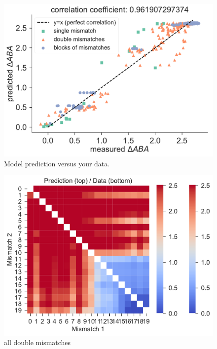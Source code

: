 \documentclass[a4paper,twoside]{revtex4-1}
\begin{document}
\begin{figure}[H]
	\centering
	\includegraphics[width=\textwidth]{correlation_plot_Ilya}
	\caption{Model prediction versus your data. }
\end{figure}

\begin{figure}[H]
	\centering
	\includegraphics[width=\textwidth]{double_mm_heatmap}
	\caption{all double mismatches }
\end{figure}
\end{document}
